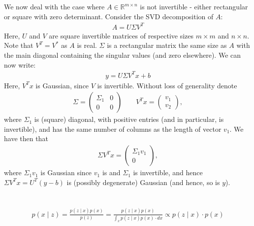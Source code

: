 \documentclass[a4paper]{scrreprt}
\begin{document}
We now deal with the case where $A\in \mathbb{R}^{m\times n}$ is not invertible 
- either rectangular or 
square with zero determinant. 
Consider the SVD decomposition of $A$: 
\begin{gather}
	A = U \Sigma V^T
\end{gather}
Here, $U$ and $V$ are square invertible matrices of respective sizes $m\times 
m$ and $n\times n$. Note that $V^T=V^\ast$ as $A$ is real. 
$\Sigma$ is a rectangular matrix the same size as $A$ with 
the main diagonal containing the singular values (and zero elsewhere). We can 
now write: 
\begin{gather}
	y = U\Sigma V^Tx + b
\end{gather}
Here, $V^Tx$ is Gaussian, since $V$ is invertible. Without loss of generality 
denote 
\begin{gather}
	\Sigma = \begin{pmatrix}
	\Sigma_1 & 0 \\ 0 & 0
	\end{pmatrix} \qquad V^Tx = \begin{pmatrix}
	v_1 \\ v_2
	\end{pmatrix},
\end{gather}
where $\Sigma_1$ is (square) diagonal, with positive entries (and in 
particular, is 
invertible), and has the same number of columns as the length of vector $v_1$. 
We have then that 
\begin{gather}
	\Sigma V^T x = \begin{pmatrix}
	\Sigma_1 v_1 \\ 0
	\end{pmatrix}, 
\end{gather}
where $\Sigma_1 v_1$ is Gaussian since $v_1$ is and $\Sigma_1$ is invertible, 
and hence $\Sigma V^T x =U^T (y-b)$ is (possibly degenerate) Gaussian (and 
hence, 
so is $y$). 

\chapter{}
\section{}
\begin{gather}
	p(x\mid z) = \frac{p(z\mid x) p(x)}{p(z)} = \frac{p(z\mid x) p(x)}{\int_x 
	p(z\mid x) p(x)\cdot dx} \propto p(z\mid x)\cdot p(x)
\end{gather}
\end{document}
